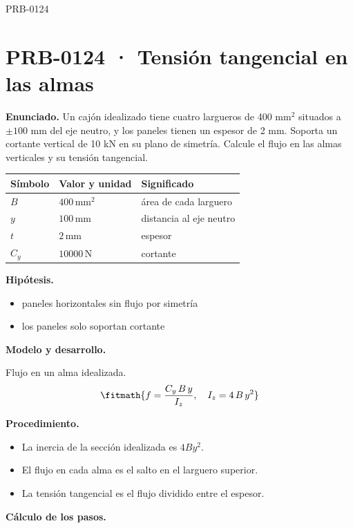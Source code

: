 \begin{studiumworked}{PRB-0124}

\section{PRB-0124 · Tensión tangencial en las almas}

\textbf{Enunciado.} Un cajón idealizado tiene cuatro largueros de 400 mm$^2$ situados a $\pm 100$ mm del eje neutro, y los paneles tienen un espesor de 2 mm. Soporta un cortante vertical de 10 kN en su plano de simetría. Calcule el flujo en las almas verticales y su tensión tangencial.

\par\medskip\noindent\begin{tabular}{@{}p{.18\linewidth}p{.26\linewidth}p{.48\linewidth}@{}}
\toprule Símbolo & Valor y unidad & Significado\\\midrule
$B$ & $400\,\mathrm{mm^2}$ & área de cada larguero\\
$y$ & $100\,\mathrm{mm}$ & distancia al eje neutro\\
$t$ & $2\,\mathrm{mm}$ & espesor\\
$C_{y}$ & $10000\,\mathrm{N}$ & cortante\\
\bottomrule\end{tabular}\par\medskip

\textbf{Hipótesis.}\begin{itemize}\item paneles horizontales sin flujo por simetría
\item los paneles solo soportan cortante\end{itemize}

\textbf{Modelo y desarrollo.}

Flujo en un alma idealizada.\[\fitmath{f = \frac{C_y\,B\,y}{I_z},\quad I_z = 4\,B\,y^{2}}\]

\textbf{Procedimiento.}\begin{itemize}\item La inercia de la sección idealizada es $4 B y^2$.
\item El flujo en cada alma es el salto en el larguero superior.
\item La tensión tangencial es el flujo dividido entre el espesor.\end{itemize}

\textbf{Cálculo de los pasos.}

\begin{enumerate}


\end{enumerate}
\end{studiumworked}
